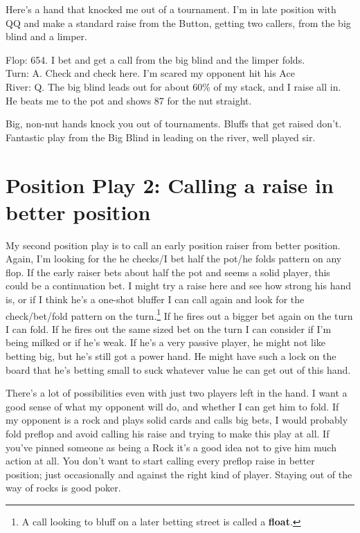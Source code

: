 
Here's a hand that knocked me out of a tournament.
I'm in late position with QQ and make a standard raise from the Button,
getting two callers, from the big blind and a limper.

Flop: 654. I bet and get a call from the big blind and the limper folds. \\
Turn: A. Check and check here. I'm scared my opponent hit his Ace \\
River: Q.  The big blind leads out for about 60\% of my stack, and I raise all
in. He beats me to the pot and shows 87 for the nut straight.

Big, non-nut hands knock you out of tournaments. Bluffs that get
raised don't. Fantastic play from the Big Blind in leading on the
river, well played sir.

\section{Position Play 2: Calling a raise in better position}

My second position play is to call an early position raiser from better
position. Again, I'm looking for the he checks/I bet half the pot/he folds
pattern on any flop. If the early raiser bets about half the
pot and seems a solid player, this could be a continuation bet. I might
try a raise here and see how strong his hand is, or if I think he's a
one-shot bluffer I can call again and look for the check/bet/fold
pattern on the turn.\footnote{A call looking to bluff on a later betting
street is called a \textbf{float}.} If he fires out a bigger bet again
on the turn I
can fold. If he fires out the same sized bet on the turn I can consider if
I'm being milked or if he's weak. If he's a very passive player,
he might not like betting big, but he's still got a power hand. He
might have such a lock on the board that he's betting small to suck
whatever value he can get out of this hand.

There's a lot of possibilities even with just two players left in the hand.
I want a good sense of what my opponent will do, and whether I can
get him to fold. If my opponent is a rock and plays solid cards
and calls big bets, I would probably fold preflop and avoid calling his raise
and trying to make this play at all. If you've pinned someone as being
a Rock it's a good idea not to give him much action at all. You don't
want to start calling every preflop raise in better position;
just occasionally and against the right kind of player. Staying
out of the way of rocks is good poker.

